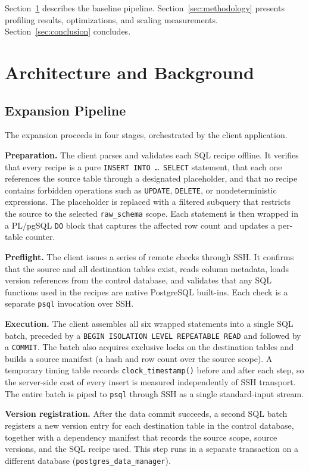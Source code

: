 \documentclass[journal]{IEEEtran}
\begin{document}
Section~\ref{sec:architecture} describes the baseline pipeline.
Section~\ref{sec:methodology} presents profiling results, optimizations, and scaling measurements.
Section~\ref{sec:conclusion} concludes.

\section{Architecture and Background}
\label{sec:architecture}

\subsection{Expansion Pipeline}
\label{sec:pipeline}

The expansion proceeds in four stages, orchestrated by the client application.

\textbf{Preparation.}
The client parses and validates each SQL recipe offline.
It verifies that every recipe is a pure \texttt{INSERT INTO \ldots\ SELECT} statement, that each one references the source table through a designated placeholder, and that no recipe contains forbidden operations such as \texttt{UPDATE}, \texttt{DELETE}, or nondeterministic expressions.
The placeholder is replaced with a filtered subquery that restricts the source to the selected \texttt{raw\_schema} scope.
Each statement is then wrapped in a PL/pgSQL \texttt{DO} block that captures the affected row count and updates a per-table counter.

\textbf{Preflight.}
The client issues a series of remote checks through SSH.
It confirms that the source and all destination tables exist, reads column metadata, loads version references from the control database, and validates that any SQL functions used in the recipes are native PostgreSQL built-ins.
Each check is a separate \texttt{psql} invocation over SSH.

\textbf{Execution.}
The client assembles all six wrapped statements into a single SQL batch, preceded by a \texttt{BEGIN ISOLATION LEVEL REPEATABLE READ} and followed by a \texttt{COMMIT}.
The batch also acquires exclusive locks on the destination tables and builds a source manifest (a hash and row count over the source scope).
A temporary timing table records \texttt{clock\_timestamp()} before and after each step, so the server-side cost of every insert is measured independently of SSH transport.
The entire batch is piped to \texttt{psql} through SSH as a single standard-input stream.

\textbf{Version registration.}
After the data commit succeeds, a second SQL batch registers a new version entry for each destination table in the control database, together with a dependency manifest that records the source scope, source versions, and the SQL recipe used.
This step runs in a separate transaction on a different database (\texttt{postgres\_data\_manager}).
\end{document}
